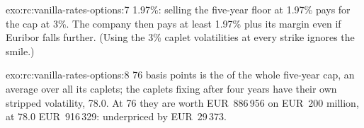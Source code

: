 \begin{solution}{exo:rc:vanilla-rates-options:7}
1.97\%: selling the five-year floor at 1.97\% pays for the cap at 3\%. The
company then pays at least 1.97\% plus its margin even if Euribor falls
further. (Using the 3\% caplet volatilities at every strike ignores the smile.)
\end{solution}

\begin{solution}{exo:rc:vanilla-rates-options:8}
76 basis points is the  of the whole five-year cap, an average
over all its caplets; the caplets fixing after four years have their own
stripped volatility, 78.0. At 76 they are worth EUR~886\,956 on EUR~200 million,
at 78.0 EUR~916\,329: underpriced by EUR~29\,373.
\end{solution}

